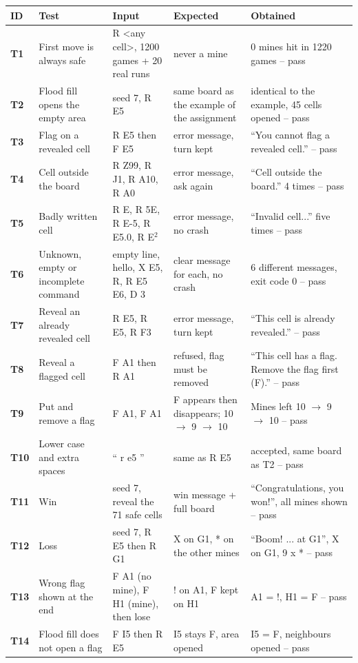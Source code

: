 \documentclass[11pt,a4paper]{article}
\begin{document}
{\footnotesize
\renewcommand{\arraystretch}{1.1}
\begin{longtable}{>{\bfseries}l p{3.2cm} p{3.6cm} p{3.4cm} p{3.6cm}}
\toprule
\textbf{ID} & \textbf{Test} & \textbf{Input} & \textbf{Expected} & \textbf{Obtained}\\
\midrule
\endhead
T1 & First move is always safe & R <any cell>, 1200 games + 20 real runs & never a mine & 0 mines hit in 1220 games -- pass\\
T2 & Flood fill opens the empty area & seed 7, R E5 & same board as the example of the assignment & identical to the example, 45 cells opened -- pass\\
T3 & Flag on a revealed cell & R E5 then F E5 & error message, turn kept & ``You cannot flag a revealed cell.'' -- pass\\
T4 & Cell outside the board & R Z99, R J1, R A10, R A0 & error message, ask again & ``Cell outside the board.'' 4 times -- pass\\
T5 & Badly written cell & R E, R 5E, R E-5, R E5.0, R E$^2$ & error message, no crash & ``Invalid cell...'' five times -- pass\\
T6 & Unknown, empty or incomplete command & empty line, hello, X E5, R, R E5 E6, D 3 & clear message for each, no crash & 6 different messages, exit code 0 -- pass\\
T7 & Reveal an already revealed cell & R E5, R E5, R F3 & error message, turn kept & ``This cell is already revealed.'' -- pass\\
T8 & Reveal a flagged cell & F A1 then R A1 & refused, flag must be removed & ``This cell has a flag. Remove the flag first (F).'' -- pass\\
T9 & Put and remove a flag & F A1, F A1 & F appears then disappears; 10 $\rightarrow$ 9 $\rightarrow$ 10 & Mines left 10 $\rightarrow$ 9 $\rightarrow$ 10 -- pass\\
T10 & Lower case and extra spaces & ``   r   e5  '' & same as R E5 & accepted, same board as T2 -- pass\\
T11 & Win & seed 7, reveal the 71 safe cells & win message + full board & ``Congratulations, you won!'', all mines shown -- pass\\
T12 & Loss & seed 7, R E5 then R G1 & X on G1, * on the other mines & ``Boom! ... at G1'', X on G1, 9 x * -- pass\\
T13 & Wrong flag shown at the end & F A1 (no mine), F H1 (mine), then lose & ! on A1, F kept on H1 & A1 = !, H1 = F -- pass\\
T14 & Flood fill does not open a flag & F I5 then R E5 & I5 stays F, area opened & I5 = F, neighbours opened -- pass\\

\end{longtable}}
\end{document}
